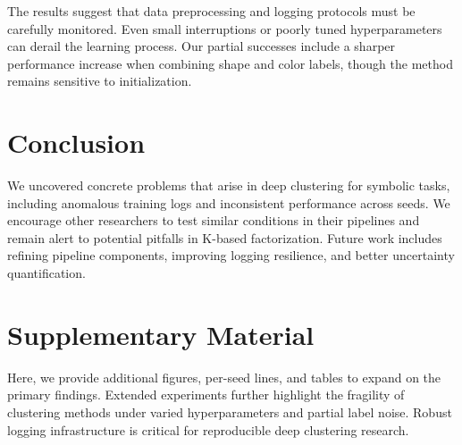 \documentclass{article}
\begin{document}
The results suggest that data preprocessing and logging protocols must be carefully monitored. Even small interruptions or poorly tuned hyperparameters can derail the learning process. Our partial successes include a sharper performance increase when combining shape and color labels, though the method remains sensitive to initialization.

\section{Conclusion}
We uncovered concrete problems that arise in deep clustering for symbolic tasks, including anomalous training logs and inconsistent performance across seeds. We encourage other researchers to test similar conditions in their pipelines and remain alert to potential pitfalls in K-based factorization. Future work includes refining pipeline components, improving logging resilience, and better uncertainty quantification.

{\small


}

\appendix
\section{Supplementary Material}
Here, we provide additional figures, per-seed lines, and tables to expand on the primary findings. Extended experiments further highlight the fragility of clustering methods under varied hyperparameters and partial label noise. Robust logging infrastructure is critical for reproducible deep clustering research.
\end{document}
